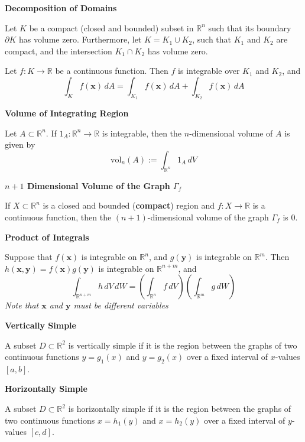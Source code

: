 \documentclass{article}
\newcommand{\R}{\mathbb{R}}
\newenvironment{definition}[1]{
    \par\noindent\textbf{#1}\par\noindent
}{
    \par \vspace{0.5cm}
}
\begin{document}
\begin{definition}{Decomposition of Domains}
    Let \( K \) be a compact (closed and bounded) subset in \( \R^n \) such that its boundary \( \partial K \) has volume zero. Furthermore, let \( K = K_1 \cup K_2 \), such that \( K_1 \) and \( K_2 \) are compact, and the intersection \( K_1 \cap K_2 \) has volume zero.

    Let \( f : K \to \R \) be a continuous function. Then \( f \) is integrable over \( K_1 \) and \( K_2 \), and
    \[ \int_K f(\bm{x}) \, dA = \int_{K_1} f(\bm{x}) \, dA + \int_{K_2} f(\bm{x}) \, dA \]
\end{definition}


\begin{definition}{Volume of Integrating Region}
    Let \( A \subset \R^n \). If \( 1_A : \R^n \to \R \) is integrable, then the \( n \)-dimensional volume of \( A \) is given by
    \[ \text{vol}_n(A) := \int_{\R^n} 1_A \, dV \]
\end{definition}

\begin{definition}{\( n + 1 \) Dimensional Volume of the Graph \( \Gamma_f \)}
    If \( X \subset \R^n \) is a closed and bounded (\textbf{compact}) region and \( f: X \to \R \) is a continuous function, then the \( (n + 1) \)-dimensional volume of the graph \( \Gamma_f \) is 0.
\end{definition}


\begin{definition}{Product of Integrals}
    Suppose that \( f(\bm{x}) \) is integrable on \( \R^n \), and \( g(\bm{y}) \) is integrable on \( \R^m \). Then \( h(\bm{x},\bm{y}) = f(\bm{x})g(\bm{y}) \) is integrable on \( \R^{n+m} \), and
    \[ \int_{\R^{n+m}} h \, dV \, dW = \left( \int_{\R^n} f \, dV \right) \left( \int_{\R^m} g \, dW \right) \]
    \textit{Note that \(\bm{x}\) and \(\bm{y}\) must be different variables}
\end{definition}

\begin{definition}{Vertically Simple}
    A subset \( D \subset \R^2 \) is vertically simple if it is the region between the graphs of
    two continuous functions \( y = g_1(x) \) and \( y = g_2(x) \) over a fixed interval of \( x \)-values \([a, b]\).
\end{definition}


\begin{definition}{Horizontally Simple}
    A subset \( D \subset \R^2 \) is horizontally simple if it is the region between the graphs
    of two continuous functions \( x = h_1(y) \) and \( x = h_2(y) \) over a fixed interval of \( y \)-values \([c, d]\).
\end{definition}
\end{document}
